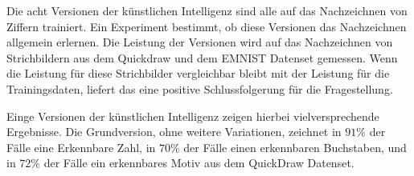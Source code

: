 Die acht Versionen der künstlichen Intelligenz sind alle auf das Nachzeichnen
von Ziffern trainiert. Ein Experiment bestimmt, ob diese Versionen das
Nachzeichnen allgemein erlernen. Die Leistung der Versionen wird auf das
Nachzeichnen von Strichbildern aus dem Quickdraw und dem EMNIST Datenset
gemessen. Wenn die Leistung für diese Strichbilder vergleichbar bleibt mit der
Leistung für die Trainingsdaten, liefert das eine positive Schlussfolgerung für
die Fragestellung.

Einge Versionen der künstlichen Intelligenz zeigen hierbei vielversprechende
Ergebnisse. Die Grundversion, ohne weitere Variationen, zeichnet in $91\%$ der
Fälle eine Erkennbare Zahl, in $70\%$ der Fälle einen erkennbaren Buchstaben,
und in $72\%$ der Fälle ein erkennbares Motiv aus dem QuickDraw Datenset. 


